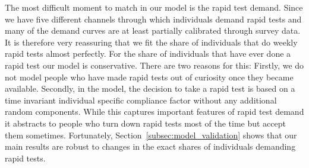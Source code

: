 The most difficult moment to match in our model is the rapid test demand. Since we have
five different channels through which individuals demand rapid tests and many of the
demand curves are at least partially calibrated through survey data. It is therefore very
reassuring that we fit the share of individuals that do weekly rapid tests almost
perfectly. For the share of individuals that have ever done a rapid test our model is
conservative. There are two reasons for this: Firstly, we do not model people who have
made rapid tests out of curiosity once they became available. Secondly, in the model,
the decision to take a rapid test is based on a time invariant individual specific
compliance factor without any additional random components. While this captures
important features of rapid test demand it abstracts to people who turn down rapid tests
most of the time but accept them sometimes. Fortunately,
Section~\ref{subsec:model_validation} shows
that our main results are robust to changes in the exact shares of individuals demanding
rapid tests.

